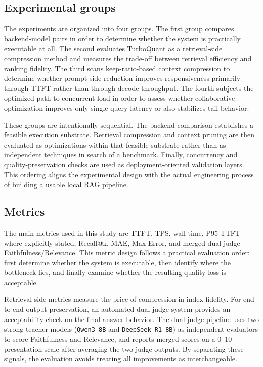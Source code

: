 \documentclass[10pt,twocolumn]{article}
\begin{document}
\subsection{Experimental groups}

The experiments are organized into four groups. The first group compares backend-model pairs in order to determine whether the system is practically executable at all. The second evaluates TurboQuant as a retrieval-side compression method and measures the trade-off between retrieval efficiency and ranking fidelity. The third scans keep-ratio-based context compression to determine whether prompt-side reduction improves responsiveness primarily through TTFT rather than through decode throughput. The fourth subjects the optimized path to concurrent load in order to assess whether collaborative optimization improves only single-query latency or also stabilizes tail behavior.

These groups are intentionally sequential. The backend comparison establishes a feasible execution substrate. Retrieval compression and context pruning are then evaluated as optimizations within that feasible substrate rather than as independent techniques in search of a benchmark. Finally, concurrency and quality-preservation checks are used as deployment-oriented validation layers. This ordering aligns the experimental design with the actual engineering process of building a usable local RAG pipeline.

\subsection{Metrics}

The main metrics used in this study are TTFT, TPS, wall time, P95 TTFT where explicitly stated, Recall@k, MAE, Max Error, and merged dual-judge Faithfulness/Relevance. This metric design follows a practical evaluation order: first determine whether the system is executable, then identify where the bottleneck lies, and finally examine whether the resulting quality loss is acceptable.

Retrieval-side metrics measure the price of compression in index fidelity. For end-to-end output preservation, an automated dual-judge system provides an acceptability check on the final answer behavior. The dual-judge pipeline uses two strong teacher models (\texttt{Qwen3-8B} and \texttt{DeepSeek-R1-8B}) as independent evaluators to score Faithfulness and Relevance, and reports merged scores on a $0$--$10$ presentation scale after averaging the two judge outputs. By separating these signals, the evaluation avoids treating all improvements as interchangeable.
\end{document}
